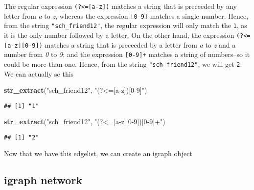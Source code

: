 \documentclass[]{book}
\newenvironment{Shaded}{\begin{snugshade}}{\end{snugshade}}
\newcommand{\KeywordTok}[1]{\textcolor[rgb]{0.13,0.29,0.53}{\textbf{#1}}}
\newcommand{\StringTok}[1]{\textcolor[rgb]{0.31,0.60,0.02}{#1}}
\newcommand{\OperatorTok}[1]{\textcolor[rgb]{0.81,0.36,0.00}{\textbf{#1}}}
\newcommand{\NormalTok}[1]{#1}
\theoremstyle{definition}
\theoremstyle{definition}
\theoremstyle{definition}
\theoremstyle{remark}
\begin{document}
\begin{enumerate}
  The regular expression \texttt{(?\textless{}={[}a-z{]})} matches a
  string that is preceeded by any letter from \emph{a} to \emph{z},
  whereas the expression \texttt{{[}0-9{]}} matches a single number.
  Hence, from the string \texttt{"sch\_friend12"}, the regular
  expression will only match the \texttt{1}, as it is the only number
  followed by a letter. On the other hand, the expression
  \texttt{(?\textless{}={[}a-z{]}{[}0-9{]})} matches a string that is
  preceeded by a letter from \emph{a} to \emph{z} and a number from
  \emph{0} to \emph{9}; and the expression \texttt{{[}0-9{]}+} matches a
  string of numbers--so it could be more than one. Hence, from the
  string \texttt{"sch\_friend12"}, we will get \texttt{2}. We can
  actually se this

\begin{Shaded}
\begin{Highlighting}[]
\KeywordTok{str_extract}\NormalTok{(}\StringTok{"sch_friend12"}\NormalTok{, }\StringTok{"(?<=[a-z])[0-9]"}\NormalTok{)}
\end{Highlighting}
\end{Shaded}

\begin{verbatim}
## [1] "1"
\end{verbatim}

\begin{Shaded}
\begin{Highlighting}[]
\KeywordTok{str_extract}\NormalTok{(}\StringTok{"sch_friend12"}\NormalTok{, }\StringTok{"(?<=[a-z][0-9])[0-9]+"}\NormalTok{)}
\end{Highlighting}
\end{Shaded}

\begin{verbatim}
## [1] "2"
\end{verbatim}
\end{enumerate}

Now that we have this edgelist, we can create an igraph object

\subsection{igraph network}\label{igraph-network}

\begin{Shaded}
\end{Shaded}
\end{document}
